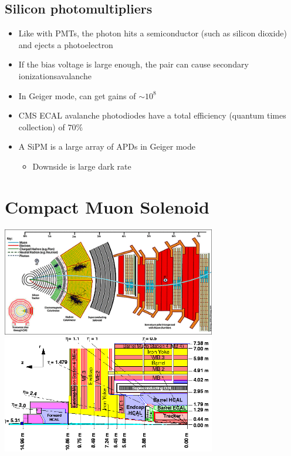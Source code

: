 \subsection{Silicon photomultipliers}
\begin{itemize}
  \item Like with PMTs, the photon hits a semiconductor (such as silicon dioxide) and ejects a photoelectron
  \item If the bias voltage is large enough, the pair can cause secondary ionizations\thus avalanche
  \item In Geiger mode, can get gains of $\sim 10^8$
  \item CMS ECAL avalanche photodiodes have a total efficiency (quantum times collection) of $70\%$
  \item A SiPM is a large array of APDs in Geiger mode
  \begin{itemize}
    \item Downside is large dark rate
  \end{itemize}
\end{itemize}

\section{Compact Muon Solenoid}
\begin{center}
  \includegraphics[width=0.7\textwidth]{figs/cms_xphi.png}
  \includegraphics[width=0.7\textwidth]{figs/cms_etaz.png}
\end{center}
